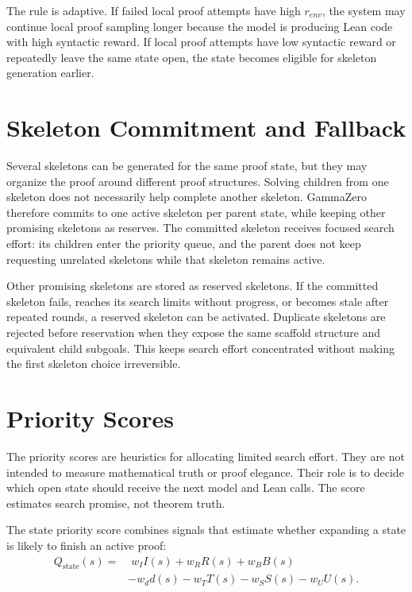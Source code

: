 The rule is adaptive. If failed local proof attempts have high \(r_{env}\), the system may continue local proof sampling longer because the model is producing Lean code with high syntactic reward. If local proof attempts have low syntactic reward or repeatedly leave the same state open, the state becomes eligible for skeleton generation earlier.

\section{Skeleton Commitment and Fallback}

Several skeletons can be generated for the same proof state, but they may organize the proof around different proof structures. Solving children from one skeleton does not necessarily help complete another skeleton. GammaZero therefore commits to one active skeleton per parent state, while keeping other promising skeletons as reserves. The committed skeleton receives focused search effort: its children enter the priority queue, and the parent does not keep requesting unrelated skeletons while that skeleton remains active.

Other promising skeletons are stored as reserved skeletons. If the committed skeleton fails, reaches its search limits without progress, or becomes stale after repeated rounds, a reserved skeleton can be activated. Duplicate skeletons are rejected before reservation when they expose the same scaffold structure and equivalent child subgoals. This keeps search effort concentrated without making the first skeleton choice irreversible.

\section{Priority Scores}

The priority scores are heuristics for allocating limited search effort. They are not intended to measure mathematical truth or proof elegance. Their role is to decide which open state should receive the next model and Lean calls. The score estimates search promise, not theorem truth.

The state priority score combines signals that estimate whether expanding a state is likely to finish an active proof:
\[
\begin{aligned}
Q_{\mathrm{state}}(s) =
&\; w_I I(s)
+ w_R R(s)
+ w_B B(s) \\
&- w_d d(s)
- w_T T(s)
- w_S S(s)
- w_U U(s).
\end{aligned}
\]

